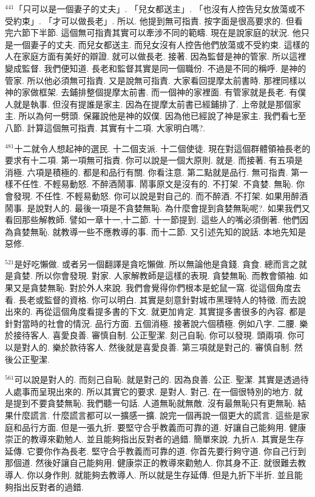 \documentclass{book}
\begin{document}
$^{441}$「只可以是一個妻子的丈夫」.
「兒女都送主」.
「也沒有人控告兒女放蕩或不受約束」.
「才可以做長老」.
所以.
他提到無可指責.
按字面是很高要求的.
但看完六節下半節.
這個無可指責其實可以牽涉不同的範疇.
現在是說家庭的狀況.
他只是一個妻子的丈夫.
而兒女都送主.
而兒女沒有人控告他們放蕩或不受約束.
這樣的人在家庭方面有美好的辯證.
就可以做長老.
接著.
因為監督是神的管家.
所以這裡變成監督.
我們便知道.
長老和監督其實是同一個職份.
不過是不同的稱呼.
是神的管家.
所以他必須無可指責.
又是說無可指責.
大家看回提摩太前書時.
那裡同樣以神的家做框架.
去鋪排整個提摩太前書.
而一個神的家裡面.
有管家就是長老.
有僕人就是執事.
但沒有提誰是家主.
因為在提摩太前書已經鋪排了.
上帝就是那個家主.
所以為何一劈頭.
保羅說他是神的奴僕.
因為他已經說了神是家主.
我們看七至八節.
計算這個無可指責.
其實有十二項.
大家明白嗎?.

$^{481}$十二就令人想起神的選民.
十二個支派.
十二個使徒.
現在對這個群體領袖長老的要求有十二項.
第一項無可指責.
你可以說是一個大原則.
就是.
而接著.
有五項是消極.
六項是積極的.
都是和品行有關.
你看注意.
第二點就是品行.
無可指責.
第一樣不任性.
不輕易動怒.
不醉酒鬧事.
鬧事原文是沒有的.
不打架.
不貪婪.
無恥.
你會發現.
不任性.
不輕易動怒.
你可以說是對自己的.
而不醉酒.
不打架.
如果用醉酒鬧事.
是說對人的.
最後一項是不貪婪無恥.
為什麼會提到貪婪無恥呢?.
如果我們又看回那些解教師.
譬如一章十一,十二節.
十一節提到.
這些人的嘴必須倒著.
他們因為貪婪無恥.
就教導一些不應教導的事.
而十二節.
又引述先知的說話.
本地先知是惡修.

$^{521}$是好吃懶做.
或者另一個翻譯是貪吃懶做.
所以無論他是貪錢.
貪食.
總而言之就是貪婪.
所以你會發現.
對家.
人家解教師是這樣的表現.
貪婪無恥.
而教會領袖.
如果又是貪婪無恥.
對於外人來說.
我們會覺得你們根本是蛇鼠一窩.
從這個角度去看.
長老或監督的資格.
你可以明白.
其實是刻意針對城市黑理特人的特徵.
而去說出來的.
再從這個角度看提多書的下文.
就更加肯定.
其實提多書很多的內容.
都是針對當時的社會的情況.
品行方面.
五個消極.
接著說六個積極.
例如八字.
二腰.
樂於接待客人.
喜愛良善.
審慎自制.
公正聖潔.
刻己自恥.
你可以發現.
頭兩項.
你可以是對人的.
樂於款待客人.
然後就是喜愛良善.
第三項就是對己的.
審慎自制.
然後公正聖潔.

$^{561}$可以說是對人的.
而刻己自恥.
就是對己的.
因為良善.
公正.
聖潔.
其實是透過待人處事而呈現出來的.
所以其實它的要求.
是對人.
對己.
在一個很特別的地方.
就是提到不要貪婪無恥.
我們聽一句話.
人道無恥就無敵.
沒有最無恥只有更無恥.
結果什麼謊言.
什麼謊言都可以一擴感一擴.
說完一個再說一個更大的謊言.
這些是家庭和品行方面.
但是一張九折.
要堅守合乎教義而可靠的道.
好讓自己能夠用.
健康崇正的教導來勸勉人.
並且能夠指出反對者的過錯.
簡單來說.
九折A.
其實是生存延傳.
它要你作為長老.
堅守合乎教義而可靠的道.
你首先要行夠守道.
你自己行到那個道.
然後好讓自己能夠用.
健康崇正的教導來勸勉人.
你其身不正.
就很難去教導人.
你以身作則.
就能夠去教導人.
所以就是生存延傳.
但是九折下半折.
並且能夠指出反對者的過錯.
\end{document}
